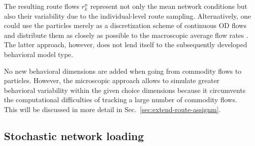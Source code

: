 %
%
%
%

The resulting route flows $r_k^{n}$
represent not only the mean network conditions
but also their variability due to the individual-level
route sampling.
Alternatively, one could use the particles merely as a 
discretization scheme of continuous
OD flows and distribute them as closely as possible to the
macroscopic average flow rates \citep[e.g.,][]{zhang-2008}.
The latter approach, however, does not lend itself to
the subsequently developed behavioral model type.


No new behavioral dimensions are added when going from commodity
flows to particles. However, the microscopic approach allows
to simulate greater behavioral variability within the given
choice dimensions because it circumvents the computational
difficulties of tracking a large number of commodity flows.  This will
be discussed in more detail in Sec.~\ref{sec:extend-route-assignm}.


\subsection{Stochastic network loading}
\label{sec:stoch-netw-load}

